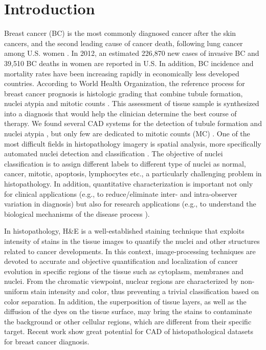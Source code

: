 \documentclass[10pt,twocolumn,letterpaper]{article}
\begin{document}
\section{Introduction}
Breast cancer (BC) is the most commonly diagnosed cancer after the skin cancers, and the second leading cause of cancer death, following lung cancer among U.S. women \cite{jiemin2013}. In 2012, an estimated 226,870 new cases of invasive BC and 39,510 BC deaths in women are reported in U.S. In addition, BC incidence and mortality rates have been increasing rapidly in economically less developed countries. According to World Health Organization, the reference process for breast cancer prognosis is histologic grading that combine tubule formation, nuclei atypia and mitotic counts \cite{bloom1957, elston1993}. This assessment of tissue sample is synthesized into a diagnosis that would help the clinician determine the best course of therapy. We found several CAD systems for the detection of tubule formation \cite{petushi2006, naik2008} and nuclei atypia \cite{cosatto2008, dalle2009, chaudhury2011, dundar2011}, but only few are dedicated to mitotic counts (MC) \cite{irshad2013a, irshad2013b}. One of the most difficult fields in histopathology imagery is spatial analysis, more specifically automated nuclei detection and classification \cite{fuchs2011}. The objective of nuclei classification is to assign different labels to different type of nuclei as normal, cancer, mitotic, apoptosis, lymphocytes etc., a particularly challenging problem in histopathology. In addition, quantitative characterization is important not only for clinical applications (e.g., to reduce/eliminate inter- and intra-observer variation in diagnosis) but also for research applications (e.g., to understand the biological mechanisms of the disease process \cite{gurcan2009}).
 
In histopathology, H\&E is a well-established staining technique that exploits intensity of stains in the tissue images to quantify the nuclei and other structures related to cancer developments. In this context, image-processing techniques are devoted to accurate and objective quantification and localization of cancer evolution in specific regions of the tissue such as cytoplasm, membranes and nuclei. From the chromatic viewpoint, nuclear regions are characterized by non-uniform stain intensity and color, thus preventing a trivial classification based on color separation. In addition, the superposition of tissue layers, as well as the diffusion of the dyes on the tissue surface, may bring the stains to contaminate the background or other cellular regions, which are different from their specific target. Recent work \cite{khan2012b, irshad2013a, irshad2013b} show great potential for CAD of histopathological datasets for breast cancer diagnosis.
\end{document}
